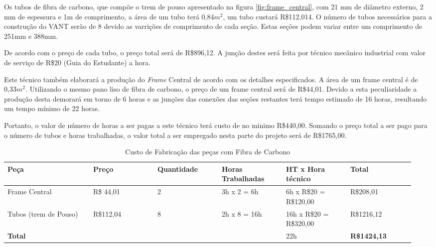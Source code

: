Os tubos de fibra de carbono, que compõe o trem de pouso apresentado na figura \ref{fig:frame_central},
com 21 mm de diâmetro externo, 2 mm de espessura e 1m de comprimento, a área de um tubo terá 0,84$m^2$, 
um tubo custará R\$112,014. O número de tubos
necessários para a construção do VANT serão de 8 devido as varrições de comprimento de cada 
seção.  Estas seções podem variar entre um comprimento de 251mm e 388mm.

De acordo com o preço de cada tubo, o preço total será de R\$896,12. A junção destes será feita
por técnico mecânico industrial com valor de serviço de R\$20 (Guia do Estudante)\footnotemark 
a hora.


Este técnico também elaborará a produção do \textit{Frame} Central de acordo com os detalhes especificados.
A área de um frame central é de 0,33$m^2$. Utilizando o mesmo pano liso de fibra de carbono, 
o preço de um frame central será de R\$44,01.  Devido a esta peculiaridade a produção desta
demorará em torno de 6 horas e as junções das conexões das seções restantes terá tempo estimado
de 16 horas,  resultando um tempo mínimo de 22 horas.

Portanto, o valor de número de horas a ser pagas a este técnico terá custo de no minimo
R\$440,00. Somando o preço total a ser pago para o número de tubos e horas trabalhadas,
o valor total a ser empregado nesta parte do projeto será de R\$1765,00.

\begin{table}[!h]
\centering
    \caption{Custo de Fabricação das peças com Fibra de Carbono}
\begin{tabular}{|p{0.20\linewidth}|p{0.15\linewidth}|p{0.15\linewidth}|p{0.15\linewidth}|p{0.15\linewidth}|p{0.15\linewidth}|}
\hline

Peça & Preço& Quantidade& Horas Trabalhadas &HT x Hora técnico& Total\\ \hline
Frame Central &R\$ 44,01& 2 &3h x 2 = 6h& 6h x R\$20 = R\$120,00& R\$208,01 \\ \hline
Tubos (trem de Pouso)& R\$112,04& 8 &2h x 8 = 16h &16h x R\$20 = R\$320,00& R\$1216,12\\ \hline
\textbf{Total} & & & & 22h & \textbf{R\$1424,13}\\ \hline

\end{tabular}
    \label{custos_carregador}
\end{table}

